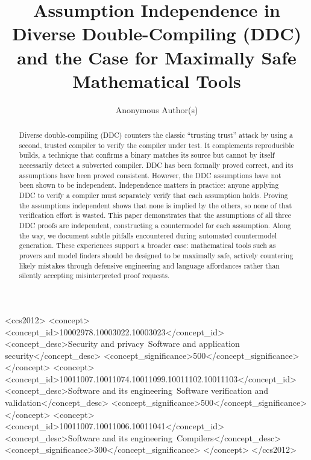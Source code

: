 
\title{Assumption Independence in Diverse Double-Compiling (DDC) and the Case for Maximally Safe Mathematical Tools}

\author{Anonymous Author(s)}

\begin{abstract}
Diverse double-compiling (DDC) counters the classic ``trusting trust'' attack by using a second, trusted compiler to verify the compiler under test. It complements reproducible builds, a technique that confirms a binary matches its source but cannot by itself necessarily detect a subverted compiler. DDC has been formally proved correct, and its assumptions have been proved consistent. However, the DDC assumptions have not been shown to be independent. Independence matters in practice: anyone applying DDC to verify a compiler must separately verify that each assumption holds. Proving the assumptions independent shows that none is implied by the others, so none of that verification effort is wasted. This paper demonstrates that the assumptions of all three DDC proofs are independent, constructing a countermodel for each assumption. Along the way, we document subtle pitfalls encountered during automated countermodel generation. These experiences support a broader case: mathematical tools such as provers and model finders should be designed to be maximally safe, actively countering likely mistakes through defensive engineering and language affordances rather than silently accepting misinterpreted proof requests.
\end{abstract}


\begin{CCSXML}
<ccs2012>
   <concept>
       <concept_id>10002978.10003022.10003023</concept_id>
       <concept_desc>Security and privacy~Software and application security</concept_desc>
       <concept_significance>500</concept_significance>
       </concept>
   <concept>
       <concept_id>10011007.10011074.10011099.10011102.10011103</concept_id>
       <concept_desc>Software and its engineering~Software verification and validation</concept_desc>
       <concept_significance>500</concept_significance>
       </concept>
   <concept>
       <concept_id>10011007.10011006.10011041</concept_id>
       <concept_desc>Software and its engineering~Compilers</concept_desc>
       <concept_significance>300</concept_significance>
       </concept>
 </ccs2012>
\end{CCSXML}

